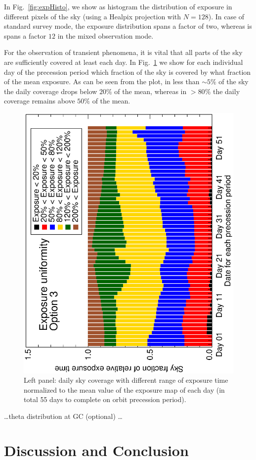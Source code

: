 \documentclass[aps,prd,superscriptaddress,showpacs,nofootinbib,fixlfloat, 12pt]{revtex4-1}
\begin{document}
In Fig.~\ref{fig:expHisto}, we show as histogram the distribution of exposure
in different pixels of the sky (using a Healpix projection with $N=128$). In
case of standard survey mode, the exposure distribution spans a factor of two,
whereas is spans a factor $12$ in the mixed observation mode. 

For the observation of transient phenomena, it is vital that all parts of the
sky are sufficiently covered at least each day. In Fig.~\ref{fig:coverage} we
show for each individual day of the precession period which fraction of the
sky is covered by what fraction of the mean exposure. As can be seen from the
plot, in less than $\sim5\%$ of the sky the daily coverage drops below $20\%$
of the mean, whereas in $>80\%$ the daily coverage remains above $50\%$ of the
mean.

\begin{figure}[t]
  \begin{center}
    \includegraphics[width=0.49\linewidth, angle=-90]{plots/exposure_pixel_hist_perday.ps}
    \vspace{-0.5cm}
  \end{center}
  \caption{Left panel: daily sky coverage with different range of exposure
  time normalized to the mean value of the exposure map of each day (in total
  55 days to complete on orbit precession period).} 
  \label{fig:coverage}
\end{figure}

\dots theta distribution at GC (optional) \dots


\section{Discussion and Conclusion}
\label{sec:Conclusion}
\end{document}
